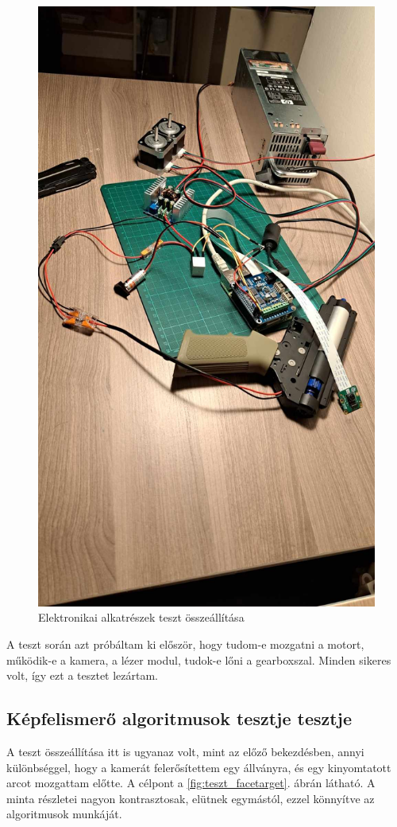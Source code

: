 \documentclass[12pt,a4paper]{article}
\begin{document}
\begin{figure}[h!]
	\centering
	\includegraphics[width=0.6\linewidth]{teszt_1}
	\caption{Elektronikai alkatrészek teszt összeállítása}
	\label{fig:teszt_1}
\end{figure}

A teszt során azt próbáltam ki először, hogy tudom-e mozgatni a motort, működik-e a kamera, a lézer modul, tudok-e lőni a gearboxszal. Minden sikeres volt, így ezt a tesztet lezártam.

\subsection{Képfelismerő algoritmusok tesztje tesztje}
A teszt összeállítása itt is ugyanaz volt, mint az előző bekezdésben, annyi különbséggel, hogy a kamerát felerősítettem egy állványra, és egy kinyomtatott arcot mozgattam előtte. A célpont a \ref{fig:teszt_facetarget}. ábrán látható. A minta részletei nagyon kontrasztosak, elütnek egymástól, ezzel könnyítve az algoritmusok munkáját.
\end{document}
